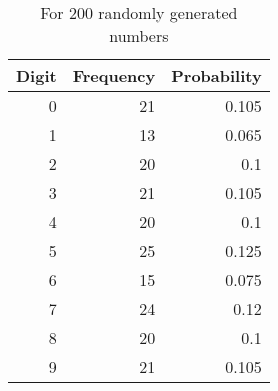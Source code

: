 \begin{table}[h]
\renewcommand\thetable{2}
  \centering
  \caption{For 200 randomly generated numbers}
    \begin{tabular}{|r|r|r|}
    \toprule
    \hline
    \multicolumn{1}{|c|}{\textbf{Digit}} & \multicolumn{1}{c|}{\textbf{Frequency}} & \multicolumn{1}{c|}{\textbf{Probability}} \\
    \midrule
    \hline
    0     & 21    & 0.105 \\
    1     & 13    & 0.065 \\
    2     & 20    & 0.1 \\
    3     & 21    & 0.105 \\
    4     & 20    & 0.1 \\
    5     & 25    & 0.125 \\
    6     & 15    & 0.075 \\
    7     & 24    & 0.12 \\
    8     & 20    & 0.1 \\
    9     & 21    & 0.105 \\
    \hline
    \end{tabular}%
  \label{tab:output_200}%
\end{table}%

